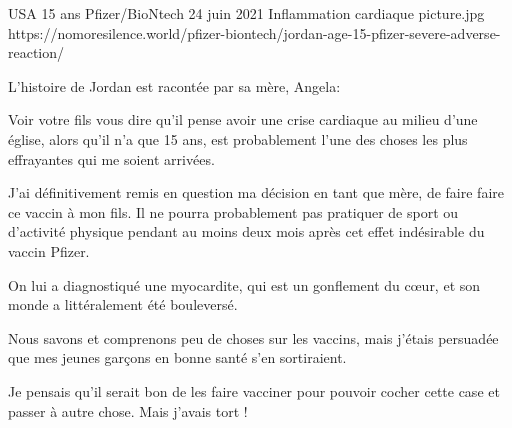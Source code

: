 {USA}
{15 ans}
{Pfizer/BioNtech}
{24 juin 2021}
{Inflammation cardiaque}
{picture.jpg}
{https://nomoresilence.world/pfizer-biontech/jordan-age-15-pfizer-severe-adverse-reaction/}
{

L'histoire de Jordan est racontée par sa mère, Angela:

Voir votre fils vous dire qu'il pense avoir une crise cardiaque au milieu d'une
église, alors qu'il n'a que 15 ans, est probablement l'une des choses les plus
effrayantes qui me soient arrivées.

J'ai définitivement remis en question ma décision en tant que mère, de faire
faire ce vaccin à mon fils. Il ne pourra probablement pas pratiquer de sport ou
d'activité physique pendant au moins deux mois après cet effet indésirable du
vaccin Pfizer.

On lui a diagnostiqué une myocardite, qui est un gonflement du cœur, et son
monde a littéralement été bouleversé.

Nous savons et comprenons peu de choses sur les vaccins, mais j'étais persuadée
que mes jeunes garçons en bonne santé s'en sortiraient.

Je pensais qu'il serait bon de les faire vacciner pour pouvoir cocher cette case
et passer à autre chose. Mais j'avais tort !

}

